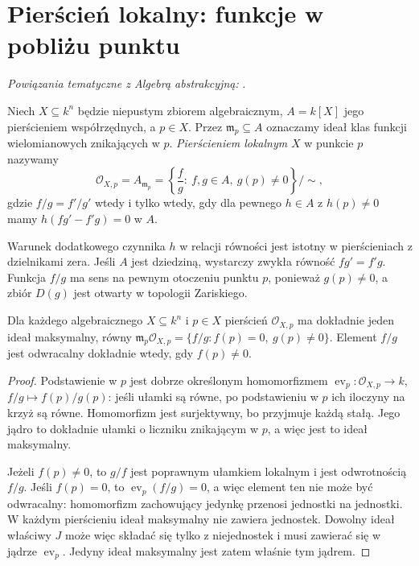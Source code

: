 \section{Pierścień lokalny: funkcje w pobliżu punktu}

\noindent\emph{Powiązania tematyczne z Algebrą abstrakcyjną:} .


\begin{definicja}
\label{def:local-ring-point}
Niech $X\subseteq k^n$ będzie niepustym zbiorem algebraicznym,
$A=k[X]$ jego pierścieniem współrzędnych, a $p\in X$.
Przez $\mathfrak m_p\subseteq A$ oznaczamy ideał klas
funkcji wielomianowych znikających w $p$.
\emph{Pierścieniem lokalnym} $X$ w punkcie $p$ nazywamy
\[
 \mathcal O_{X,p}=A_{\mathfrak m_p}
 =\left\{\frac fg:\ f,g\in A,\ g(p)\ne0\right\}/\!\sim,
\]
gdzie $f/g=f'/g'$ wtedy i tylko wtedy, gdy dla pewnego
$h\in A$ z $h(p)\ne0$ mamy $h(fg'-f'g)=0$ w $A$.
\end{definicja}

Warunek dodatkowego czynnika $h$ w relacji równości jest
istotny w pierścieniach z dzielnikami zera. Jeśli $A$
jest dziedziną, wystarczy zwykła równość $fg'=f'g$.
Funkcja $f/g$ ma sens na pewnym otoczeniu punktu $p$,
ponieważ $g(p)\ne0$, a zbiór $D(g)$ jest otwarty
w topologii Zariskiego.

\begin{twierdzenie}
\label{tw:local-unique-max}
Dla każdego algebraicznego $X\subseteq k^n$ i $p\in X$
pierścień $\mathcal O_{X,p}$ ma dokładnie jeden ideał
maksymalny, równy
$\mathfrak m_p\mathcal O_{X,p}=\{f/g:f(p)=0,\ g(p)\ne0\}$.
Element $f/g$ jest odwracalny dokładnie wtedy, gdy $f(p)\ne0$.
\end{twierdzenie}
\begin{proof}
Podstawienie w $p$ jest dobrze określonym homomorfizmem
$\operatorname{ev}_p:\mathcal O_{X,p}\to k$,
$f/g\mapsto f(p)/g(p)$: jeśli ułamki są równe,
po podstawieniu w $p$ ich iloczyny na krzyż są równe.
Homomorfizm jest surjektywny, bo przyjmuje każdą stałą.
Jego jądro to dokładnie ułamki o liczniku znikającym w $p$,
a więc jest to ideał maksymalny.

Jeżeli $f(p)\ne0$, to $g/f$ jest poprawnym ułamkiem
lokalnym i jest odwrotnością $f/g$. Jeśli $f(p)=0$,
to $\operatorname{ev}_p(f/g)=0$, a więc element ten nie
może być odwracalny: homomorfizm zachowujący jedynkę
przenosi jednostki na jednostki.
W każdym pierścieniu ideał maksymalny nie zawiera jednostek.
Dowolny ideał właściwy $J$ może więc składać się tylko
z niejednostek i musi zawierać się w jądrze
$\operatorname{ev}_p$. Jedyny ideał maksymalny jest zatem
właśnie tym jądrem.
\end{proof}

